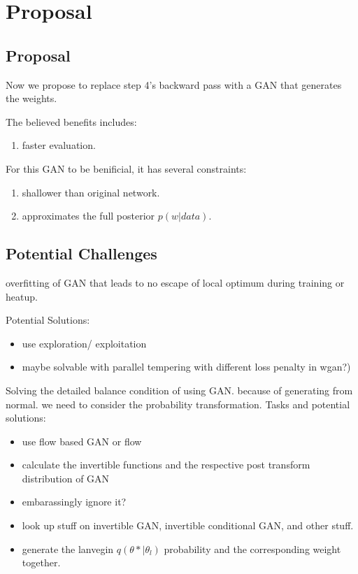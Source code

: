 \documentclass[honours,12pt]{unswthesis}
\numberwithin{equation}{section}
\begin{document}
\chapter{Proposal}

\section{Proposal}
Now we propose to replace step 4's backward pass with a GAN that generates the weights.

The believed benefits includes:
\begin{enumerate}
\item faster evaluation.
\end{enumerate}

For this GAN to be benificial, it has several constraints: 
\begin{enumerate}
    \item shallower than original network.
    \item approximates the full posterior $p(w|data)$.
\end{enumerate}

\section{Potential Challenges}
overfitting of GAN that leads to no escape of local optimum during training or heatup. 

Potential Solutions:
\begin{itemize}
\item use exploration/ exploitation 
\item maybe solvable with parallel tempering with different loss penalty in wgan?)
\end{itemize}

Solving the detailed balance condition of using GAN. because of generating from normal. we need to consider the probability transformation.
Tasks and potential solutions:
\begin{itemize}
\item use flow based GAN or flow
\item calculate the invertible functions and the respective post transform distribution of GAN
\item embarassingly ignore it?
\item look up stuff on invertible GAN, invertible conditional GAN, and other stuff.
\item generate the lanvegin $q(\theta*|\theta_l)$ probability and the corresponding weight together.
\end{itemize}
\end{document}
